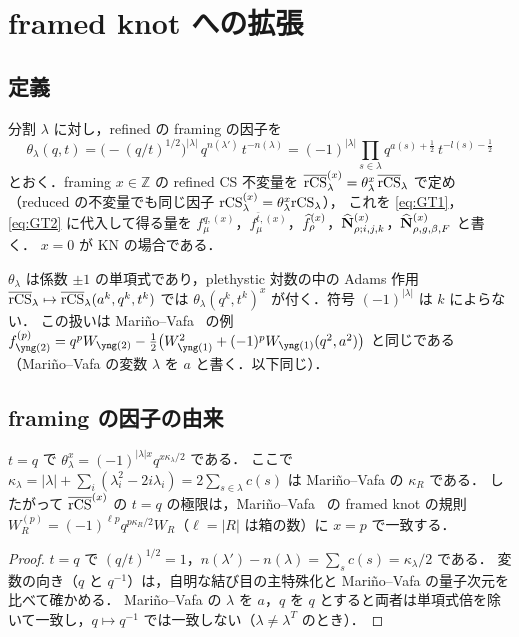 \section{framed knot への拡張}\label{sec:framing}

\subsection{定義}
\begin{definition}\label{def:framed}
分割 $\lambda$ に対し，refined の framing の因子を
\[
\theta_\lambda(q,t)=\bigl(-(q/t)^{1/2}\bigr)^{|\lambda|}\,q^{n(\lambda')}\,t^{-n(\lambda)}
=(-1)^{|\lambda|}\prod_{s\in\lambda}q^{a(s)+\frac12}\,t^{-l(s)-\frac12}
\]
とおく．framing $x\in\mathbb{Z}$ の refined CS 不変量を $\overline{\textrm{rCS}}^{(x)}_\lambda=\theta_\lambda^x\,\overline{\textrm{rCS}}_\lambda$ で定め（reduced の不変量でも同じ因子 $\textrm{rCS}^{(x)}_\lambda=\theta_\lambda^x\textrm{rCS}_\lambda$），
これを \eqref{eq:GT1}，\eqref{eq:GT2} に代入して得る量を $f^{q,(x)}_\mu$，$f^{\bar t,(x)}_\mu$，$\widehat{f}^{(x)}_\rho$，$\widehat{\mathbf{N}}^{(x)}_{\rho;i,j,k}$，$\widehat{\mathbf{N}}^{(x)}_{\rho,g,\beta,F}$ と書く．
$x=0$ が KN の場合である．
\end{definition}

$\theta_\lambda$ は係数 $\pm1$ の単項式であり，plethystic 対数の中の Adams 作用 $\overline{\textrm{rCS}}_\lambda\mapsto\overline{\textrm{rCS}}_\lambda(a^k,q^k,t^k)$ では
$\theta_\lambda(q^k,t^k)^x$ が付く．符号 $(-1)^{|\lambda|}$ は $k$ によらない．
この扱いは Mariño--Vafa~\cite{Marino01} の例
$f^{(p)}_{\yng(2)}=q^pW_{\yng(2)}-\tfrac12\bigl(W_{\yng(1)}^2+(-1)^pW_{\yng(1)}(q^2,a^2)\bigr)$ と同じである（Mariño--Vafa の変数 $\lambda$ を $a$ と書く．以下同じ）．

\subsection{framing の因子の由来}
\begin{proposition}\label{prop:MV}
$t=q$ で $\theta_\lambda^x=(-1)^{|\lambda|x}q^{x\kappa_\lambda/2}$ である．
ここで $\kappa_\lambda=|\lambda|+\sum_i(\lambda_i^2-2i\lambda_i)=2\sum_{s\in\lambda}c(s)$ は Mariño--Vafa の $\kappa_R$ である．
したがって $\overline{\textrm{rCS}}^{(x)}$ の $t=q$ の極限は，Mariño--Vafa~\cite{Marino01} の framed knot の規則 $W^{(p)}_R=(-1)^{\ell p}q^{p\kappa_R/2}W_R$（$\ell=|R|$ は箱の数）に $x=p$ で一致する．
\end{proposition}
\begin{proof}
$t=q$ で $(q/t)^{1/2}=1$，$n(\lambda')-n(\lambda)=\sum_s c(s)=\kappa_\lambda/2$ である．
変数の向き（$q$ と $q^{-1}$）は，自明な結び目の主特殊化と Mariño--Vafa の量子次元を比べて確かめる．
Mariño--Vafa の $\lambda$ を $a$，$q$ を $q$ とすると両者は単項式倍を除いて一致し，$q\mapsto q^{-1}$ では一致しない（$\lambda\neq\lambda^T$ のとき）．
\end{proof}

